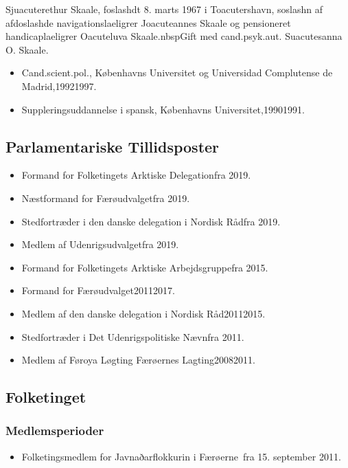 \documentclass[11pt, a4paper]{awesome-cv}
\begin{document}
\makecvheader[R]
\makelettertitle
\begin{cvletter}
Sjuacuterethur Skaale, foslashdt 8. marts 1967 i Toacutershavn, soslashn af afdoslashde navigationslaeligrer Joacuteannes Skaale og pensioneret handicaplaeligrer Oacuteluva Skaale.nbspGift med cand.psyk.aut. Suacutesanna O. Skaale.

\begin{itemize}
\item Cand.scient.pol., Københavns Universitet og Universidad Complutense de Madrid,19921997.
\item Suppleringsuddannelse i spansk, Københavns Universitet,19901991.
\end{itemize}
\subsection*{Parlamentariske Tillidsposter}
\begin{itemize}
\item Formand for Folketingets Arktiske Delegationfra 2019.
\item Næstformand for Færøudvalgetfra 2019.
\item Stedfortræder i den danske delegation i Nordisk Rådfra 2019.
\item Medlem af Udenrigsudvalgetfra 2019.
\item Formand for Folketingets Arktiske Arbejdsgruppefra 2015.
\item Formand for Færøudvalget20112017.
\item Medlem af den danske delegation i Nordisk Råd20112015.
\item Stedfortræder i Det Udenrigspolitiske Nævnfra 2011.
\item Medlem af Føroya Løgting Færøernes Lagting20082011.
\end{itemize}
\subsection*{Folketinget}
\subsubsection*{Medlemsperioder}
\begin{itemize}
\item Folketingsmedlem for Javnaðarflokkurin i Færøerne fra 15. september 2011.
\end{itemize}

\end{cvletter}
\end{document}
